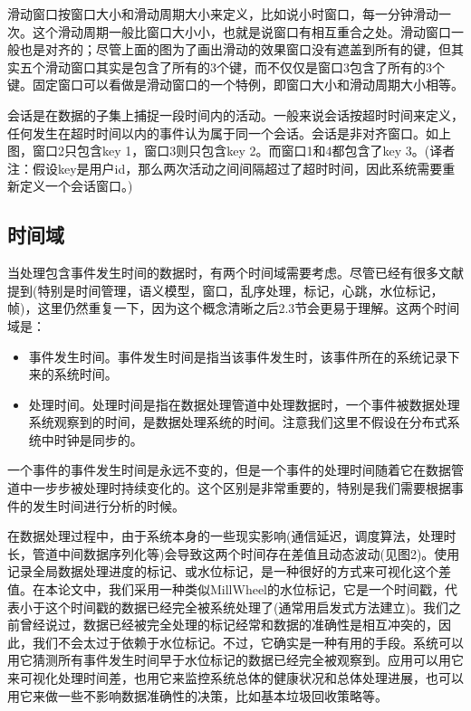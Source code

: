 \documentclass[oneside]{ctexbook}
\begin{document}
滑动窗口按窗口大小和滑动周期大小来定义，比如说小时窗口，每一分钟滑动一次。这个滑动周期一般比窗口大小小，也就是说窗口有相互重合之处。滑动窗口一般也是对齐的；尽管上面的图为了画出滑动的效果窗口没有遮盖到所有的键，但其实五个滑动窗口其实是包含了所有的3个键，而不仅仅是窗口3包含了所有的3个键。固定窗口可以看做是滑动窗口的一个特例，即窗口大小和滑动周期大小相等。

会话是在数据的子集上捕捉一段时间内的活动。一般来说会话按超时时间来定义，任何发生在超时时间以内的事件认为属于同一个会话。会话是非对齐窗口。如上图，窗口2只包含key 1，窗口3则只包含key 2。而窗口1和4都包含了key 3。(译者注：假设key是用户id，那么两次活动之间间隔超过了超时时间，因此系统需要重新定义一个会话窗口。)

\subsection{时间域}

当处理包含事件发生时间的数据时，有两个时间域需要考虑。尽管已经有很多文献提到(特别是时间管理，语义模型，窗口，乱序处理，标记，心跳，水位标记，帧)，这里仍然重复一下，因为这个概念清晰之后2.3节会更易于理解。这两个时间域是：

\begin{itemize}
\item 事件发生时间。事件发生时间是指当该事件发生时，该事件所在的系统记录下来的系统时间。
\item 处理时间。处理时间是指在数据处理管道中处理数据时，一个事件被数据处理系统观察到的时间，是数据处理系统的时间。注意我们这里不假设在分布式系统中时钟是同步的。
\end{itemize}
一个事件的事件发生时间是永远不变的，但是一个事件的处理时间随着它在数据管道中一步步被处理时持续变化的。这个区别是非常重要的，特别是我们需要根据事件的发生时间进行分析的时候。

在数据处理过程中，由于系统本身的一些现实影响(通信延迟，调度算法，处理时长，管道中间数据序列化等)会导致这两个时间存在差值且动态波动(见图2)。使用记录全局数据处理进度的标记、或水位标记，是一种很好的方式来可视化这个差值。在本论文中，我们采用一种类似MillWheel的水位标记，它是一个时间戳，代表小于这个时间戳的数据已经完全被系统处理了(通常用启发式方法建立)。我们之前曾经说过，数据已经被完全处理的标记经常和数据的准确性是相互冲突的，因此，我们不会太过于依赖于水位标记。不过，它确实是一种有用的手段。系统可以用它猜测所有事件发生时间早于水位标记的数据已经完全被观察到。应用可以用它来可视化处理时间差，也用它来监控系统总体的健康状况和总体处理进展，也可以用它来做一些不影响数据准确性的决策，比如基本垃圾回收策略等。
\end{document}
